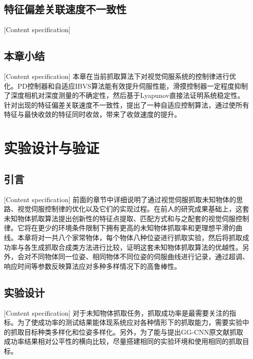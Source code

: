 \documentclass[fontset=fandol,type=bachelor,campus=harbin]{hithesisbook}
\begin{document}
\section{特征偏差关联速度不一致性}[Content specification]

\section{本章小结}[Content specification]
本章在当前抓取算法下对视觉伺服系统的控制律进行优化。PD控制器和自适应IBVS算法能有效提升伺服性能，滑摸控制器一定程度抑制了深度相机对深度测量的不确定性，然后基于Lyapunov直接法证明系统稳定性。针对出现的特征偏差关联速度不一致性，提出了一种自适应控制算法，通过使所有特征与最快收敛的特征同时收敛，带来了收敛速度的提升。

\chapter{实验设计与验证}
\section{引言}[Content specification]
前面的章节中详细说明了通过视觉伺服抓取未知物体的思路、视觉伺服控制律的优化以及它们的实现过程。在前人的研究成果基础上，这套未知物体抓取算法提出创新性的特征点提取、匹配方式和与之配套的视觉伺服控制律。它将在更少的环境条件限制下拥有更高的未知物体抓取率和更理想平滑的曲线。本章将对一共八个家常物体，每个物体八种位姿进行抓取实验，然后将抓取成功率与各生成抓取合成类方法进行比较，证明这套未知物体抓取算法的优越性。另外，会对不同物体同一位姿、相同物体不同位姿的伺服曲线进行记录，通过超调、响应时间等参数反映算法应对多种多样情况下的高鲁棒性。

\section{实验设计}[Content specification]
对于未知物体抓取任务，抓取成功率是最需要关注的指标。为了使成功率的测试结果能体现系统应对各种情形下的抓取能力，需要实验中的抓取目标种类多样化和位姿多样化。另外，为了能与提出GG-CNN原文献抓取成功率结果相对公平性的横向比较，尽量搭建相同的实验环境和使用相同的抓取目标。
\end{document}
